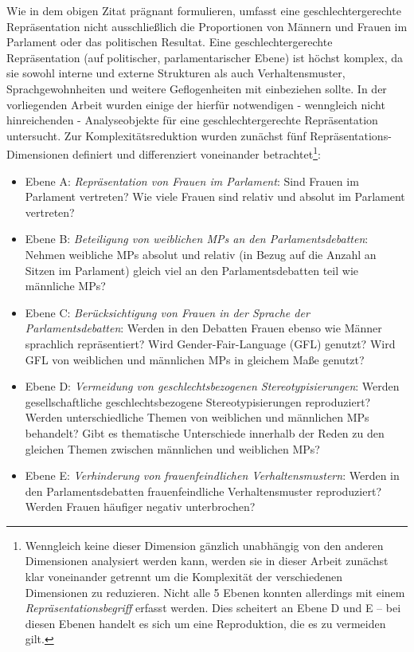 \documentclass[12pt, 
    twoside=false, 
    bibliography=totoc, 
    numbers=endperiod, 
    headings=normal, 
    toc=chapterentrydotfill
    ]{scrbook}
\begin{document}
Wie \textcite{erikson_2018} in dem obigen Zitat prägnant formulieren, umfasst eine geschlechtergerechte Repräsentation nicht ausschließlich die Proportionen von Männern und Frauen im Parlament oder das politischen Resultat. Eine geschlechtergerechte Repräsentation (auf politischer, parlamentarischer Ebene) ist höchst komplex, da sie sowohl interne und externe Strukturen als auch Verhaltensmuster, Sprachgewohnheiten und weitere Geflogenheiten mit einbeziehen sollte. In der vorliegenden Arbeit wurden einige der hierfür notwendigen - wenngleich nicht hinreichenden - Analyseobjekte für eine geschlechtergerechte Repräsentation untersucht. Zur Komplexitätsreduktion wurden zunächst fünf Repräsentations-Dimensionen definiert und differenziert voneinander betrachtet\footnote{Wenngleich keine dieser Dimension gänzlich unabhängig von den anderen Dimensionen analysiert werden kann, werden sie in dieser Arbeit zunächst klar voneinander getrennt um die Komplexität der verschiedenen Dimensionen zu reduzieren. Nicht alle 5 Ebenen konnten allerdings mit einem \emph{Repräsentationsbegriff} erfasst werden. Dies scheitert an Ebene D und E -- bei diesen Ebenen handelt es sich um eine Reproduktion, die es zu vermeiden gilt.}: 
\begin{itemize}
    \item Ebene A: \emph{Repräsentation von Frauen im Parlament}: Sind Frauen im Parlament vertreten? Wie viele Frauen sind relativ und absolut im Parlament vertreten? 
    \item Ebene B: \emph{Beteiligung von weiblichen MPs an den Parlamentsdebatten}: Nehmen weibliche MPs absolut und relativ (in Bezug auf die Anzahl an Sitzen im Parlament) gleich viel an den Parlamentsdebatten teil wie männliche MPs? 
    \item Ebene C: \emph{Berücksichtigung von Frauen in der Sprache der Parlamentsdebatten}: Werden in den Debatten Frauen ebenso wie Männer sprachlich repräsentiert? Wird Gender-Fair-Language (GFL) genutzt? Wird GFL von weiblichen und männlichen MPs in gleichem Maße genutzt? 
    \item Ebene D: \emph{Vermeidung von geschlechtsbezogenen Stereotypisierungen}: Werden gesellschaftliche geschlechtsbezogene Stereotypisierungen reproduziert? Werden unterschiedliche Themen von weiblichen und männlichen MPs behandelt? Gibt es thematische Unterschiede innerhalb der Reden zu den gleichen Themen zwischen männlichen und weiblichen MPs? 
    \item Ebene E: \emph{Verhinderung von frauenfeindlichen Verhaltensmustern}: Werden in den Parlamentsdebatten frauenfeindliche Verhaltensmuster reproduziert? Werden Frauen häufiger negativ unterbrochen? 
    \end{itemize}
\end{document}
